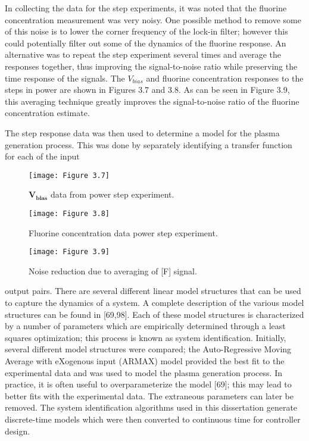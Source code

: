 In collecting the data for the step experiments, it was noted that the fluorine concentration measurement was very noisy. One possible method to remove some of this noise is to lower the corner frequency of the lock-in filter; however this could potentially filter out some of the dynamics of the fluorine response. An alternative was to repeat the step experiment several times and average the responses together, thus improving the signal-to-noise ratio while preserving the time response of the signals. The $V_{bias}$ and fluorine concentration responses to the steps in power are shown in Figures 3.7 and 3.8. As can be seen in Figure 3.9, this averaging technique greatly improves the signal-to-noise ratio of the fluorine concentration estimate.

The step response data was then used to determine a model for the plasma generation process. This was done by separately identifying a transfer function for each of the input

\begin{figure}[H]
	\centering
	\texttt{[image: Figure 3.7]}
	\bf\caption{ $\mathbf{V_{bias}}$ data from power step experiment.}
	\label{fig:3.7}
\end{figure}

\begin{figure}[H]
	\centering
	\texttt{[image: Figure 3.8]}
	\bf\caption{ Fluorine concentration data power step experiment.}
	\label{fig:3.8}
\end{figure}

\begin{figure}[H]
	\centering
	\texttt{[image: Figure 3.9]}
	\bf\caption{ Noise reduction due to averaging of [F] signal.}
	\label{fig:3.9}
\end{figure}

\noindent output pairs. There are several different linear model structures that can be used to capture the dynamics of a system. A complete description of the various model structures can be
found in [69,98]. Each of these model structures is characterized by a number of parameters which are empirically determined through a least squares optimization; this process is known
as system identification. Initially, several different model structures were compared; the Auto-Regressive Moving Average with eXogenous input (ARMAX) model provided the best fit to the experimental data and was used to model the plasma generation process. In practice, it is often useful to overparameterize the model [69]; this may lead to better fits with the experimental data. The extraneous parameters can later be removed. The system
identification algorithms used in this dissertation generate discrete-time models which were then converted to continuous time for controller design.

